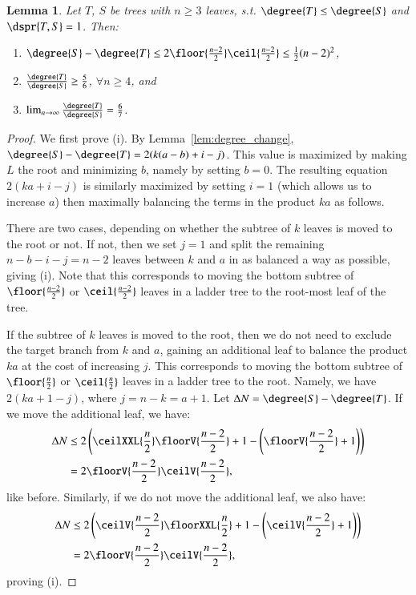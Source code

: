\documentclass[]{elsarticle}
\newtheorem{lem}[thm]{Lemma}
\begin{document}
\begin{lem}
	\label{lem:degree_max_delta_adjacent}
	Let $T$, $S$ be trees with $n \ge 3$ leaves, s.t. $\degree{T} \le \degree{S}$ and $\dspr{T,S} = 1$.
	Then:
	\begin{enumerate}
		\item $\degree{S} - \degree{T} \le 2\floor{\frac{n-2}{2}}\ceil{\frac{n-2}{2}} \le \frac{1}{2} (n-2)^2 $,
		\item $\frac{\degree{T}}{\degree{S}} \ge \frac{5}{6}$, $\forall n \ge 4$, and
		\item $\lim_{n\rightarrow\infty}\frac{\degree{T}}{\degree{S}} =  \frac{6}{7}$.
	\end{enumerate}
\end{lem}
\begin{proof}
	We first prove (i).
	By Lemma~\ref{lem:degree_change}, $\degree{S} - \degree{T} = 2(k(a-b) + i - j)$.
	This value is maximized by making $L$ the root and minimizing $b$, namely by setting $b=0$.
	The resulting equation $2(ka + i - j)$ is similarly maximized by setting $i=1$ (which allows us to increase $a$) then maximally balancing the terms in the product $ka$ as follows.

	There are two cases, depending on whether the subtree of $k$ leaves is moved to the root or not.
    If not, then we set $j=1$ and split the remaining $n-b-i-j = n-2$ leaves between $k$ and $a$ in as balanced a way as possible, giving (i).
	Note that this corresponds to moving the bottom subtree of $\floor{\frac{n-2}{2}}$ or $\ceil{\frac{n-2}{2}}$ leaves in a ladder tree to the root-most leaf of the tree.

	If the subtree of $k$ leaves is moved to the root, then we do not need to exclude the target branch from $k$ and $a$, gaining an additional leaf to balance the product $ka$ at the cost of increasing $j$.
	This corresponds to moving the bottom subtree of $\floor{\frac{n}{2}}$ or $\ceil{\frac{n}{2}}$ leaves in a ladder tree to the root.
	Namely, we have $2(ka + 1 - j)$, where $j = n - k = a + 1$.
	Let ${\Delta}N = \degree{S} - \degree{T}$.
	If we move the additional leaf, we have:
	\begin{align*}
		{\Delta}N &\le 2\left(\ceilXXL{\frac{n}{2}}\floorV{\frac{n-2}{2}}  + 1 - \left(\floorV{\frac{n-2}{2}} + 1\right)\right) \\
		&= 2\floorV{\frac{n-2}{2}}\ceilV{\frac{n-2}{2}},
	\end{align*}
like before.
Similarly, if we do not move the additional leaf, we also have:
\begin{align*}
	{\Delta}N &\le 2 \left(\ceilV{\frac{n-2}{2}}\floorXXL{\frac{n}{2}} +1 -  \left(\ceilV{\frac{n-2}{2}} + 1\right)\right) \\
&= 2\floorV{\frac{n-2}{2}}\ceilV{\frac{n-2}{2}},
\end{align*}
proving (i).


\end{proof}
\end{document}
